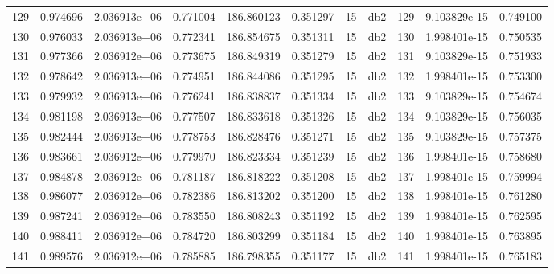 \begin{tabular}{lrrrrrrlrrr}
129  &    0.974696 &        2.036913e+06 &  0.771004 &              186.860123 &    0.351297 &      15 &          db2 &    129 &   9.103829e-15 &      0.749100 \\
130  &    0.976033 &        2.036913e+06 &  0.772341 &              186.854675 &    0.351311 &      15 &          db2 &    130 &   1.998401e-15 &      0.750535 \\
131  &    0.977366 &        2.036912e+06 &  0.773675 &              186.849319 &    0.351279 &      15 &          db2 &    131 &   9.103829e-15 &      0.751933 \\
132  &    0.978642 &        2.036913e+06 &  0.774951 &              186.844086 &    0.351295 &      15 &          db2 &    132 &   1.998401e-15 &      0.753300 \\
133  &    0.979932 &        2.036913e+06 &  0.776241 &              186.838837 &    0.351334 &      15 &          db2 &    133 &   9.103829e-15 &      0.754674 \\
134  &    0.981198 &        2.036913e+06 &  0.777507 &              186.833618 &    0.351326 &      15 &          db2 &    134 &   9.103829e-15 &      0.756035 \\
135  &    0.982444 &        2.036913e+06 &  0.778753 &              186.828476 &    0.351271 &      15 &          db2 &    135 &   9.103829e-15 &      0.757375 \\
136  &    0.983661 &        2.036912e+06 &  0.779970 &              186.823334 &    0.351239 &      15 &          db2 &    136 &   1.998401e-15 &      0.758680 \\
137  &    0.984878 &        2.036912e+06 &  0.781187 &              186.818222 &    0.351208 &      15 &          db2 &    137 &   1.998401e-15 &      0.759994 \\
138  &    0.986077 &        2.036912e+06 &  0.782386 &              186.813202 &    0.351200 &      15 &          db2 &    138 &   1.998401e-15 &      0.761280 \\
139  &    0.987241 &        2.036912e+06 &  0.783550 &              186.808243 &    0.351192 &      15 &          db2 &    139 &   1.998401e-15 &      0.762595 \\
140  &    0.988411 &        2.036912e+06 &  0.784720 &              186.803299 &    0.351184 &      15 &          db2 &    140 &   1.998401e-15 &      0.763895 \\
141  &    0.989576 &        2.036912e+06 &  0.785885 &              186.798355 &    0.351177 &      15 &          db2 &    141 &   1.998401e-15 &      0.765183 \\

\end{tabular}
